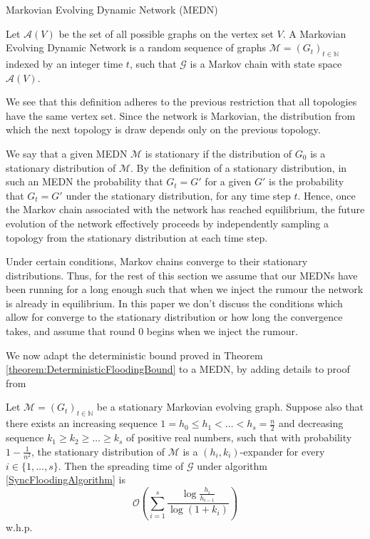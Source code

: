 \label{subsection:MEDNBound}

\begin{definition}
	Markovian Evolving Dynamic Network (MEDN)

	\noindent 
	Let $\mathcal{A}(V)$ be the set of all possible graphs on the vertex set $V$.
	A Markovian Evolving Dynamic Network is a random sequence of graphs $\mathcal{M} = (G_t)_{t \in \mathbb{N}}$ indexed by an integer time $t$, such that $\mathcal{G}$ is a Markov chain with state space $\mathcal{A}(V)$.
\end{definition}

We see that this definition adheres to the previous restriction that all topologies have the same vertex set. Since the network is Markovian, the distribution from which the next topology is draw depends only on the previous topology.

We say that a given MEDN $\mathcal{M}$ is stationary if the distribution of $G_0$ is a stationary distribution of $\mathcal{M}$. By the definition of a stationary distribution, in such an MEDN the probability that $G_t = G'$ for a given $G'$ is the probability that $G_t = G'$ under the stationary distribution, for any time step $t$. Hence, once the Markov chain associated with the network has reached equilibrium, %
the future evolution of the network effectively proceeds by independently sampling a topology from the stationary distribution at each time step. %

Under certain conditions, Markov chains converge to their stationary distributions. Thus, for the rest of this section we assume that our MEDNs have been running for a long enough such that when we inject the rumour the network is already in equilibrium. In this paper we don't discuss the conditions which allow for converge to the stationary distribution or how long the convergence takes, and assume that round 0 begins when we inject the rumour.

We now adapt the deterministic bound proved in Theorem \ref{theorem:DeterministicFloodingBound} to a MEDN, by adding details to proof from \cite{syncPaper}


\begin{theorem}\label{theorem:markovSyncBound}
	Let $\mathcal{M} = (G_t)_{t \in \mathbb{N}}$  be a stationary Markovian evolving graph. Suppose also that there exists an increasing sequence $1 = h_0 \leq h_1 < \dots < h_s = \frac{n}{2}$ and decreasing sequence $k_1 \geq k_2 \geq \dots \geq k_s$ of positive real numbers, such that with probability $1-\frac{1}{n^2}$, the stationary distribution of $\mathcal{M}$ is a $(h_i, k_i)$-expander for every $i \in \{1, \dots , s\}$. Then the spreading time of $\mathcal{G}$ under algorithm \ref{SyncFloodingAlgorithm} is
	$$
		\mathcal{O}\left(\sum_{i=1}^s \frac{\log \frac{h_i}{h_{i-1}}}{\log(1+k_i)}\right)
	$$
	w.h.p.
\end{theorem}

